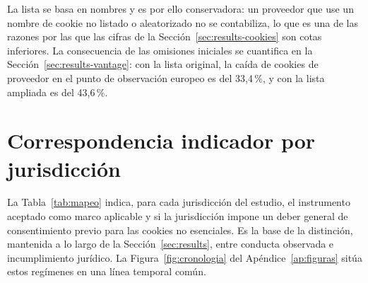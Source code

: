 \documentclass[pdflatex,sn-basic,Numbered,iicol]{sn-jnl}
\theoremstyle{thmstyleone}
\theoremstyle{thmstyletwo}
\theoremstyle{thmstylethree}
\begin{document}
\begin{appendices}
La lista se basa en nombres y es por ello conservadora: un proveedor que use un nombre de cookie no listado o aleatorizado no se contabiliza, lo que es una de las razones por las que las cifras de la Secci\'on~\ref{sec:results-cookies} son cotas inferiores. La consecuencia de las omisiones iniciales se cuantifica en la Secci\'on~\ref{sec:results-vantage}: con la lista original, la ca\'ida de cookies de proveedor en el punto de observaci\'on europeo es del 33,4\,\%, y con la lista ampliada es del 43,6\,\%.

\section{Correspondencia indicador por jurisdicci\'on}\label{ap:mapeo}
\setcounter{table}{0}\setcounter{figure}{0}

La Tabla~\ref{tab:mapeo} indica, para cada jurisdicci\'on del estudio, el instrumento aceptado como marco aplicable y si la jurisdicci\'on impone un deber general de consentimiento previo para las cookies no esenciales. Es la base de la distinci\'on, mantenida a lo largo de la Secci\'on~\ref{sec:results}, entre conducta observada e incumplimiento jur\'idico. La Figura~\ref{fig:cronologia} del Ap\'endice~\ref{ap:figuras} sit\'ua estos reg\'imenes en una l\'inea temporal com\'un.


\end{appendices}
\end{document}
